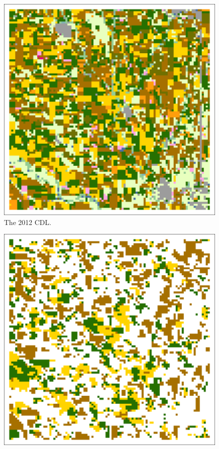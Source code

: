 \begin{ssfigure}
  \centering
  \begin{subfigure}[t]{.475\textwidth}
    \includegraphics[width=\textwidth]{Graphics/Testing/clip1_MODIS_CDL.pdf}
    \caption{The 2012 CDL.}
    \label{subfig:ss1r1CDL}
  \end{subfigure}
  \quad
  \begin{subfigure}[t]{.475\textwidth}
    \includegraphics[width=\textwidth]{Graphics/Testing/clip1_MODIS_round1.pdf}

\end{subfigure}
\end{ssfigure}
